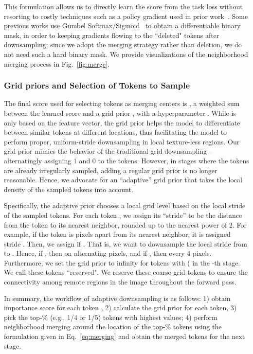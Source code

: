 \documentclass[10pt,twocolumn,letterpaper]{article}
\begin{document}
This formulation allows us to directly learn the score  from the task loss without resorting to costly techniques such as a policy gradient used in prior work~\cite{iared}. 
Some previous works use Gumbel Softmax/Sigmoid~\cite{adavit} to obtain a differentiable binary mask, in order to 
keeping gradients flowing to the ``deleted" tokens after downsampling; since we adopt the merging strategy rather than deletion, we do not need such a hard binary mask.
We provide visualizations of the neighborhood merging process in Fig.~\ref{fig:merge}.

\subsubsection{Grid priors and Selection of Tokens to Sample}
\label{sec:grid_prior}

The final score used for selecting tokens as merging centers is , a weighted sum between the learned score  and a grid prior , with a hyperparameter . While  is only based on the feature vector, the grid prior helps the model to differentiate between similar tokens at different locations, thus facilitating the model to perform proper, uniform-stride downsampling in local texture-less regions.
Our grid prior  mimics the behavior of the traditional grid downsampling -- alternatingly assigning 1 and 0 to the tokens. However, in stages where the tokens are already irregularly sampled, adding a regular grid prior is no longer reasonable. Hence, we advocate for an ``adaptive'' grid prior that takes the local density of the sampled tokens into account.

Specifically, the adaptive prior chooses a local grid level based on the local stride of the sampled tokens. For each token , we assign its ``stride''  to be the distance from the token to its nearest neighbor, rounded up to the nearest power of 2. For example, if the token is  pixels apart from its nearest neighbor, it is assigned stride . Then, we assign  if . That is, we want to downsample the local stride from  to . Hence, if , then  on alternating pixels, and if , then  every 4 pixels. 
Furthermore, we set the grid prior to infinity for tokens with ( in the -th stage.  We call these tokens ``reserved". We reserve these coarse-grid tokens to ensure the connectivity among remote regions in the image throughout the forward pass.







In summary, the workflow of adaptive downsampling is as follows: 1) obtain importance score  for each token , 2) calculate the grid prior  for each token, 3) pick the top-\% (e.g., 1/4 or 1/5) tokens with highest  values;
4) perform neighborhood merging around the location of the top-\% tokens using the formulation given in Eq.~\eqref{eq:merging} and obtain the merged tokens for the next stage.
\end{document}
